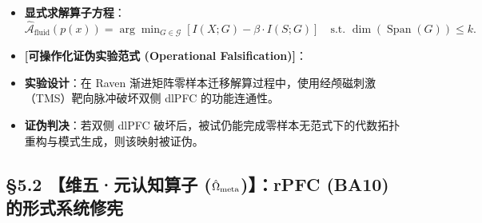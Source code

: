 \documentclass[11pt,a4paper,oneside]{ctexart}
\begin{document}
\begin{itemize}\item \textbf{显式求解算子方程}：$\hat{\mathcal{A}}_{\text{fluid}}(p(x)) = \arg\min_{G \in \mathcal{G}} \left[ I(X; G) - \beta \cdot I(S; G) \right] \quad \text{s.t. } \operatorname{dim}(\operatorname{Span}(G)) \le k.$\end{itemize}
\begin{itemize}\item \textbf{[可操作化证伪实验范式 (Operational Falsification)]}：\end{itemize}
\begin{itemize}\item \textbf{实验设计}：在 Raven 渐进矩阵零样本迁移解算过程中，使用经颅磁刺激（TMS）靶向脉冲破坏双侧 dlPFC 的功能连通性。\end{itemize}
\begin{itemize}\item \textbf{证伪判决}：若双侧 dlPFC 破坏后，被试仍能完成零样本无范式下的代数拓扑重构与模式生成，则该映射被证伪。\end{itemize}

\subsection{§5.2 【维五·元认知算子 ($\protect\hat{\Omega}_{\text{meta}}$)】：rPFC (BA10) 的形式系统修宪}
\end{document}
